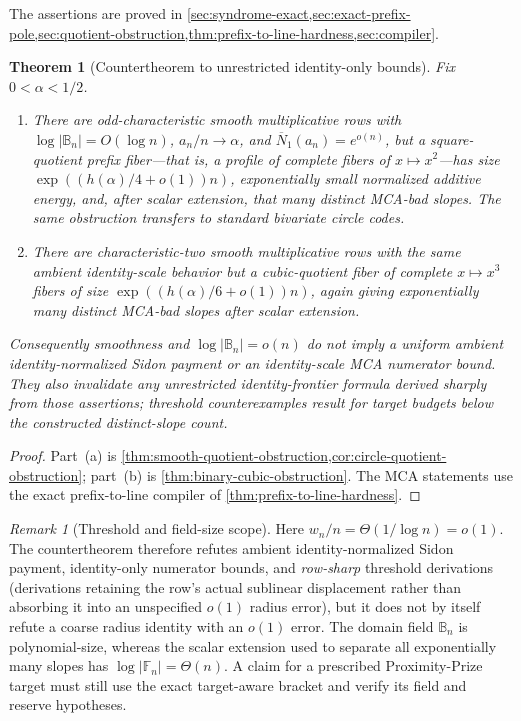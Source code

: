 \documentclass[12pt,a4paper]{amsart}
\numberwithin{equation}{section}
\newtheorem{theorem}{Theorem}[section]
\theoremstyle{remark}
\newtheorem{remark}[remark]{Remark}
\newcommand{\F}{\mathbb F}
\newcommand{\B}{\mathbb B}
\newcommand{\barN}{\overline N}
\newcommand{\abs}[1]{\lvert #1\rvert}
\begin{document}
The assertions are proved in
\cref{sec:syndrome-exact,sec:exact-prefix-pole,sec:quotient-obstruction,thm:prefix-to-line-hardness,sec:compiler}.
\begin{theorem}[Countertheorem to unrestricted identity-only bounds]
\label{thm:intro-countertheorem}
Fix \(0<\alpha<1/2\).
\begin{enumerate}[label=\textup{(\alph*)},leftmargin=*]
\item There are odd-characteristic smooth multiplicative rows with
      \(\log|\B_n|=O(\log n)\), \(a_n/n\to\alpha\), and
      \(\barN_1(a_n)=e^{o(n)}\), but a square-quotient prefix fiber---that
      is, a profile of complete fibers of \(x\mapsto x^2\)---has size
      \(\exp((h(\alpha)/4+o(1))n)\), exponentially small normalized
      additive energy, and, after scalar extension, that many distinct
      MCA-bad slopes.  The same obstruction transfers to standard
      bivariate circle codes.
\item There are characteristic-two smooth multiplicative rows with the
      same ambient identity-scale behavior but a cubic-quotient fiber of
      complete \(x\mapsto x^3\) fibers of size
      \(\exp((h(\alpha)/6+o(1))n)\), again giving exponentially many
      distinct MCA-bad slopes after scalar extension.
\end{enumerate}
Consequently smoothness and \(\log|\B_n|=o(n)\) do not imply a uniform
ambient identity-normalized Sidon payment or an identity-scale MCA
numerator bound.  They also invalidate any unrestricted identity-frontier
formula derived sharply from those assertions; threshold counterexamples result
for target budgets below the constructed distinct-slope count.
\end{theorem}

\begin{proof}
Part~\textup{(a)} is
\cref{thm:smooth-quotient-obstruction,cor:circle-quotient-obstruction};
part~\textup{(b)} is
\cref{thm:binary-cubic-obstruction}.  The MCA statements use the exact
prefix-to-line compiler of \cref{thm:prefix-to-line-hardness}.
\end{proof}

\begin{remark}[Threshold and field-size scope]
\label{rem:intro-countertheorem-scope}
Here \(w_n/n=\Theta(1/\log n)=o(1)\).  The countertheorem therefore
refutes ambient identity-normalized Sidon payment, identity-only numerator
bounds, and \emph{row-sharp} threshold derivations (derivations retaining
the row's actual sublinear displacement rather than absorbing it into an
unspecified \(o(1)\) radius error), but it does not by itself
refute a coarse radius identity with an \(o(1)\) error.  The domain field
\(\B_n\) is polynomial-size, whereas the scalar extension used to separate
all exponentially many slopes has \(\log\abs{\F_n}=\Theta(n)\).  A claim
for a prescribed Proximity-Prize target must still use the exact
target-aware bracket and verify its field and reserve hypotheses.
\end{remark}
\end{document}
